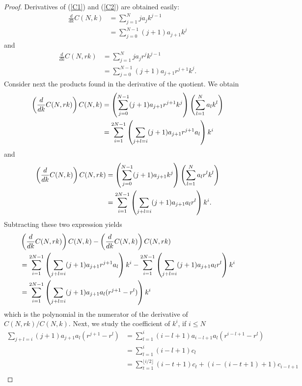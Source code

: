 \begin{proof}
Derivatives of (\ref{C1}) and (\ref{C2}) are obtained easily:
\begin{align*}
\frac{d}{dk}C(N,k) &= \sum_{j=1}^{N}ja_jk^{j-1} \\
&= \sum_{j=0}^{N-1}(j+1) a_{j+1}k^{j}
\end{align*}and
\begin{align*}
\frac{d}{dk}C(N,rk) &= \sum_{j=1}^{N}ja_jr^jk^{j-1} \\
&= \sum_{j=0}^{N-1}(j+1)a_{j+1}r^{j+1}k^{j}. 
\end{align*}Consider next the products found in the derivative of the quotient. We obtain
\begin{align*}
\left(\frac{d}{dk}C(N,rk)\right) C(N,k) &= \left( \sum_{j=0}^{N-1}(j+1)a_{j+1}r^{j+1}k^{j} \right) \left( \sum_{l=1}^{N} a_l  k^l \right) \\
&= \sum_{i = 1}^{2N-1} \left( \sum_{j+l = i} (j+1)a_{j+1}r^{j+1}a_l  \right) k^i
\end{align*}and
\begin{align*}
\left(\frac{d}{dk}C(N,k)\right) C(N,rk) &= \left( \sum_{j=0}^{N-1}(j+1)a_{j+1}k^{j} \right) \left( \sum_{l=1}^{N} a_l  r^lk^l  \right) \\
&= \sum_{i = 1}^{2N-1} \left( \sum_{j+l = i}(j+1)a_{j+1}a_l  r^l   \right) k^i.
\end{align*}
Subtracting these two expression yields
\begin{align*}
&\left(\frac{d}{dk}C(N,rk)\right) C(N,k)-\left(\frac{d}{dk}C(N,k)\right) C(N,rk) \\&= \sum_{i = 1}^{2N-1} \left( \sum_{j+l = i} (j+1)a_{j+1}r^{j+1}a_l  \right) k^i - \sum_{i = 1}^{2N-1} \left( \sum_{j+l = i}(j+1)a_{j+1}a_l  r^l   \right) k^i \\
&= \sum_{i = 1}^{2N-1} \left( \sum_{j+l = i}(j+1)a_{j+1}a_l  (r^{j+1}- r^l)   \right) k^i
\end{align*}which is the polynomial in the numerator of the derivative of $C(N,rk)/C(N,k)$.
Next, we study the coefficient of $k^i$, if $i \leq N$
\begin{align*}
\sum_{j+l = i}(j+1)a_{j+1}a_l  (r^{j+1}- r^l) &= \sum_{l=1}^{i}(i-l+1)a_{i-l+1}a_l  (r^{i-l+1}- r^l) \\
& = \sum_{l=1}^{i}(i-l+1)c_l \\
&= \sum_{t =1}^{\lfloor i / 2 \rfloor}(i-t+1)c_t + (i-(i-t + 1)+1)c_{i-t+1} \\

\end{align*}
\end{proof}
